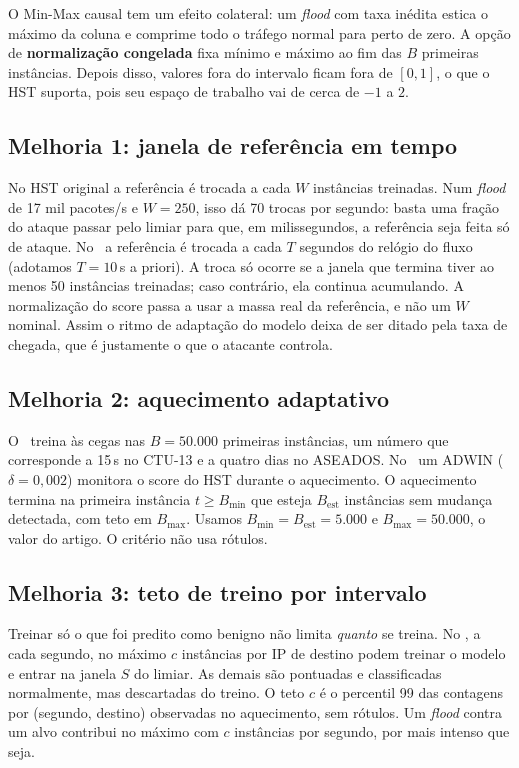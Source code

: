 O Min-Max causal tem um efeito colateral: um \emph{flood} com taxa inédita estica o máximo da
coluna e comprime todo o tráfego normal para perto de zero. A opção de \textbf{normalização
congelada} fixa mínimo e máximo ao fim das $B$ primeiras instâncias. Depois disso, valores fora do
intervalo ficam fora de $[0,1]$, o que o HST suporta, pois seu espaço de trabalho vai de cerca de
$-1$ a $2$.

\subsection{Melhoria 1: janela de referência em tempo}
No HST original a referência é trocada a cada $W$ instâncias treinadas. Num \emph{flood} de 17 mil
pacotes/s e $W=250$, isso dá 70 trocas por segundo: basta uma fração do ataque passar pelo limiar
para que, em milissegundos, a referência seja feita só de ataque. No \modusp\ a referência é trocada
a cada $T$ segundos do relógio do fluxo (adotamos $T=10$\,s a priori). A troca só ocorre se a janela
que termina tiver ao menos 50 instâncias treinadas; caso contrário, ela continua acumulando. A
normalização do score passa a usar a massa real da referência, e não um $W$ nominal. Assim o ritmo
de adaptação do modelo deixa de ser ditado pela taxa de chegada, que é justamente o que o atacante
controla.

\subsection{Melhoria 2: aquecimento adaptativo}
O \modus\ treina às cegas nas $B=50.000$ primeiras instâncias, um número que corresponde a 15\,s no
CTU-13 e a quatro dias no ASEADOS. No \modusp\ um ADWIN ($\delta=0{,}002$) monitora o score do HST
durante o aquecimento. O aquecimento termina na primeira instância $t \geq B_{\min}$ que esteja
$B_{\mathrm{est}}$ instâncias sem mudança detectada, com teto em $B_{\max}$. Usamos
$B_{\min}=B_{\mathrm{est}}=5.000$ e $B_{\max}=50.000$, o valor do artigo. O critério não usa rótulos.

\subsection{Melhoria 3: teto de treino por intervalo}
Treinar só o que foi predito como benigno não limita \emph{quanto} se treina. No \modusp, a cada
segundo, no máximo $c$ instâncias por IP de destino podem treinar o modelo e entrar na janela $S$
do limiar. As demais são pontuadas e classificadas normalmente, mas descartadas do treino. O teto
$c$ é o percentil 99 das contagens por (segundo, destino) observadas no aquecimento, sem rótulos.
Um \emph{flood} contra um alvo contribui no máximo com $c$ instâncias por segundo, por mais
intenso que seja.

